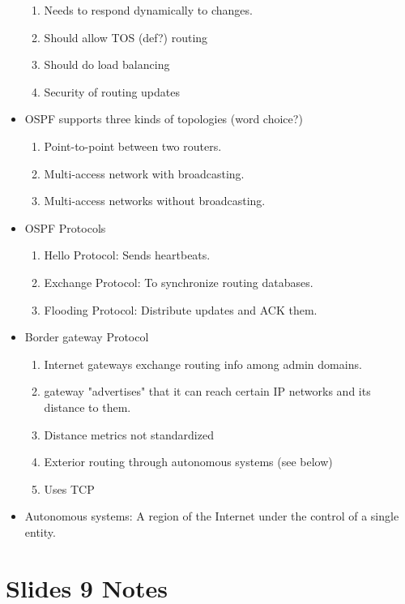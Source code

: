 \documentclass{scrartcl}
\begin{document}
\begin{itemize}
\begin{enumerate}
\item Needs to respond dynamically to changes.
\item Should allow TOS (def?) routing
\item Should do load balancing
\item Security of routing updates
\end{enumerate}
\item OSPF supports three kinds of topologies (word choice?)
\begin{enumerate}
\item Point-to-point between two routers.
\item Multi-access network with broadcasting.
\item Multi-access networks without broadcasting.
\end{enumerate}
\item OSPF Protocols
\begin{enumerate}
\item Hello Protocol: Sends heartbeats.
\item Exchange Protocol: To synchronize routing databases.
\item Flooding Protocol: Distribute updates and ACK them.
\end{enumerate}
\item Border gateway Protocol
\begin{enumerate}
\item Internet gateways exchange routing info among admin domains.
\item gateway "advertises" that it can reach certain IP networks and its 
distance to them.
\item Distance metrics not standardized
\item Exterior routing through autonomous systems (see below)
\item Uses TCP
\end{enumerate}
\item Autonomous systems: A region of the Internet under the control of a
single entity.
\end{itemize}
\section*{Slides 9 Notes}
\end{document}
